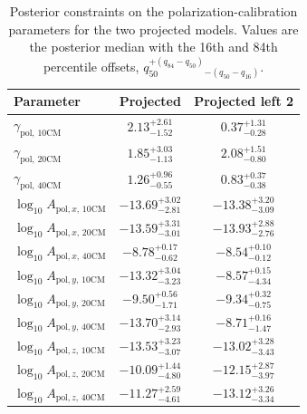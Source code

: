 \begin{table}
    \centering
    \caption{Posterior constraints on the polarization-calibration parameters for
    the two projected models. Values are the posterior median with the 16th and
    84th percentile offsets, $q_{50}^{+(q_{84}-q_{50})}_{-(q_{50}-q_{16})}$.}
    \label{tab:pol-calibration-posterior-summary}
    \begin{tabular}{lcc}
        \toprule
        Parameter & Projected & Projected left 2 \\
        \midrule
        $\gamma_{\mathrm{pol},\,10\mathrm{CM}}$
            & $2.13^{+2.61}_{-1.52}$ & $0.37^{+1.31}_{-0.28}$ \\
        $\gamma_{\mathrm{pol},\,20\mathrm{CM}}$
            & $1.85^{+3.03}_{-1.13}$ & $2.08^{+1.51}_{-0.80}$ \\
        $\gamma_{\mathrm{pol},\,40\mathrm{CM}}$
            & $1.26^{+0.96}_{-0.55}$ & $0.83^{+0.37}_{-0.38}$ \\
        \addlinespace
        $\log_{10} A_{\mathrm{pol},x,\,10\mathrm{CM}}$
            & $-13.69^{+3.02}_{-2.81}$ & $-13.38^{+3.20}_{-3.09}$ \\
        $\log_{10} A_{\mathrm{pol},x,\,20\mathrm{CM}}$
            & $-13.59^{+3.31}_{-3.01}$ & $-13.93^{+2.88}_{-2.76}$ \\
        $\log_{10} A_{\mathrm{pol},x,\,40\mathrm{CM}}$
            & $-8.78^{+0.17}_{-0.62}$ & $-8.54^{+0.10}_{-0.12}$ \\
        \addlinespace
        $\log_{10} A_{\mathrm{pol},y,\,10\mathrm{CM}}$
            & $-13.32^{+3.04}_{-3.23}$ & $-8.57^{+0.15}_{-4.34}$ \\
        $\log_{10} A_{\mathrm{pol},y,\,20\mathrm{CM}}$
            & $-9.50^{+0.56}_{-1.71}$ & $-9.34^{+0.32}_{-0.75}$ \\
        $\log_{10} A_{\mathrm{pol},y,\,40\mathrm{CM}}$
            & $-13.70^{+3.14}_{-2.93}$ & $-8.71^{+0.16}_{-1.47}$ \\
        \addlinespace
        $\log_{10} A_{\mathrm{pol},z,\,10\mathrm{CM}}$
            & $-13.53^{+3.23}_{-3.07}$ & $-13.02^{+3.28}_{-3.43}$ \\
        $\log_{10} A_{\mathrm{pol},z,\,20\mathrm{CM}}$
            & $-10.09^{+1.44}_{-4.80}$ & $-12.15^{+2.87}_{-3.97}$ \\
        $\log_{10} A_{\mathrm{pol},z,\,40\mathrm{CM}}$
            & $-11.27^{+2.59}_{-4.61}$ & $-13.12^{+3.26}_{-3.34}$ \\
        \bottomrule
    \end{tabular}
\end{table}
